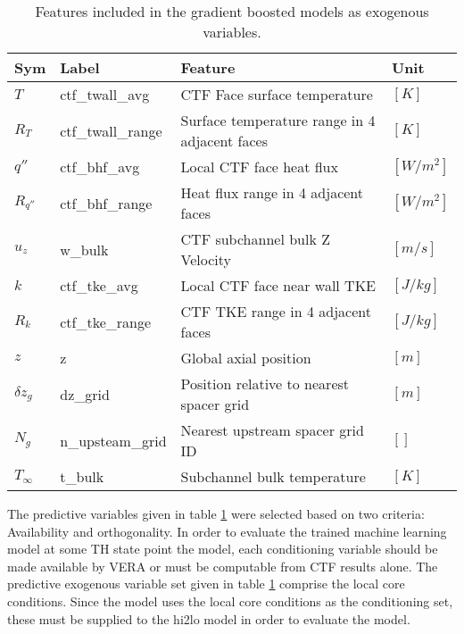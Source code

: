 \begin{table}[h]
    \begin{center}
    \caption[Included exogenous training features.]{Features included in the gradient boosted models as exogenous variables.}
\begin{tabular}[h]{|l | l | l | l |}
    \hline
    Sym & Label & Feature & Unit \\
    \hline
    \hline
    $T$ & ctf\_twall\_avg & CTF Face surface temperature & $[K]$ \\
    $R_T$ & ctf\_twall\_range & Surface temperature range in 4 adjacent faces & $[K]$ \\
    $q''$ & ctf\_bhf\_avg & Local CTF face heat flux & $[W/m^2]$ \\
    $R_{q''}$ & ctf\_bhf\_range & Heat flux range in 4 adjacent faces & $[W/m^2]$ \\
    $u_z$ & w\_bulk & CTF subchannel bulk Z Velocity &  $[m/s]$ \\
    $k$ & ctf\_tke\_avg & Local CTF face near wall TKE &  $[J/kg]$ \\
    $R_k$ & ctf\_tke\_range & CTF TKE range in 4 adjacent faces & $[J/kg]$ \\
    $z$ & z & Global axial position & $[m]$ \\
    $\delta z_g$ & dz\_grid & Position relative to nearest spacer grid & $[m]$ \\
    $N_g$ & n\_upsteam\_grid  & Nearest upstream spacer grid ID & $[]$ \\
    $T_\infty$ & t\_bulk & Subchannel bulk temperature  &  $[K]$ \\
    \hline
\end{tabular}
\label{tab:features}
\end{center}
\end{table}

The predictive variables given in table \ref{tab:features} were selected based on two criteria:  Availability and orthogonality.  In order to evaluate the trained machine learning model at some TH state point the model, each conditioning variable should be made available by VERA or must be computable from CTF results alone.   The predictive exogenous variable set given in table \ref{tab:features} comprise the local core conditions.  Since the model uses the local core conditions as the conditioning set, these must be supplied to the hi2lo model in order to evaluate the model.


